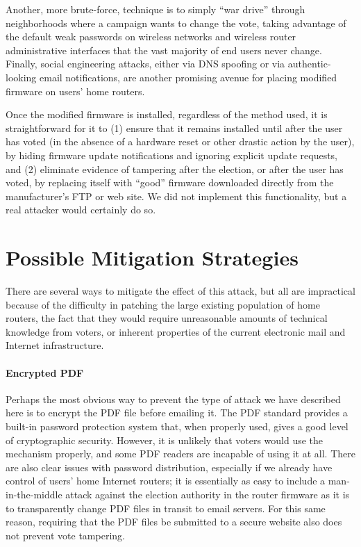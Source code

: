 \documentclass{article}
\begin{document}
Another, more brute-force, technique is to simply ``war drive''
through neighborhoods where a campaign wants to change the vote,
taking advantage of the default weak passwords on wireless networks
and wireless router administrative interfaces that the vast majority
of end users never change. Finally, social engineering attacks, either
via DNS spoofing or via authentic-looking email notifications, are
another promising avenue for placing modified firmware on users' home
routers.

Once the modified firmware is installed, regardless of the method
used, it is straightforward for it to (1) ensure that it remains
installed until after the user has voted (in the absence of a hardware
reset or other drastic action by the user), by hiding firmware update
notifications and ignoring explicit update requests, and (2) eliminate
evidence of tampering after the election, or after the user has voted,
by replacing itself with ``good'' firmware downloaded directly from
the manufacturer's FTP or web site. We did not implement this
functionality, but a real attacker would certainly do so.

\section{Possible Mitigation Strategies}

There are several ways to mitigate the effect of this attack, but all
are impractical because of the difficulty in patching the large
existing population of home routers, the fact that they would require
unreasonable amounts of technical knowledge from voters, or inherent
properties of the current electronic mail and Internet infrastructure.

\paragraph{Encrypted PDF}

Perhaps the most obvious way to prevent the type of attack we have
described here is to encrypt the PDF file before emailing it. The PDF
standard provides a built-in password protection system that, when
properly used, gives a good level of cryptographic security. However,
it is unlikely that voters would use the mechanism properly, and some
PDF readers are incapable of using it at all. There are also clear
issues with password distribution, especially if we already have
control of users' home Internet routers; it is essentially as easy to
include a man-in-the-middle attack against the election authority in
the router firmware as it is to transparently change PDF files in
transit to email servers. For this same reason, requiring that the PDF
files be submitted to a secure website also does not prevent vote
tampering.
\end{document}
